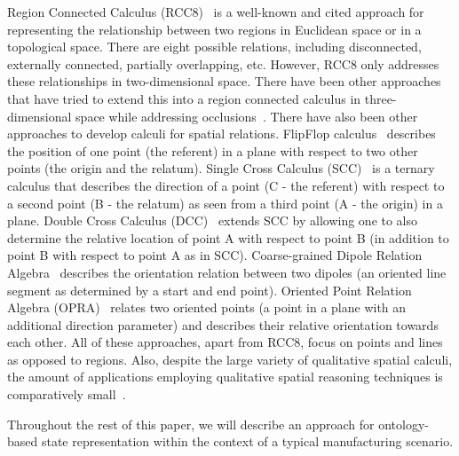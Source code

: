 \documentclass[preprint,12pt]{elsarticle}
\begin{document}
Region Connected Calculus (RCC8)~\cite{Wolter.KR.2000} is a well-known and cited approach for representing the relationship between two regions in Euclidean space or in a topological space. There are eight possible relations, including disconnected, externally connected, partially overlapping, etc. However, RCC8 only addresses these relationships in two-dimensional space. There have been other approaches that have tried to extend this into a region connected calculus in three-dimensional space while addressing occlusions~\cite{Albath.CAINE.2010}. There have also been other approaches to develop calculi for spatial relations. FlipFlop calculus~\cite{Ligozat.1993} describes the position of one point (the referent) in a plane with respect to two other points (the origin and the relatum). Single Cross Calculus (SCC)~\cite{Freksa.LNCS.1992}  is a ternary calculus that describes the direction of a point (C - the referent) with respect to a second point (B - the relatum) as seen from a third point (A - the origin) in a plane. Double Cross Calculus (DCC)~\cite{Freksa.LNCS.1992} extends SCC by allowing one to also determine the relative location of point A with respect to point B (in addition to point B with respect to point A as in SCC). Coarse-grained Dipole Relation Algebra~\cite{Schlieder.1995} describes the orientation relation between two dipoles (an oriented line segment as determined by a start and end point). Oriented Point Relation Algebra (OPRA)~\cite{Moratz.IJCAI.2005} relates two oriented points (a point in a plane with an additional direction parameter) and describes their relative orientation towards each other. All of these approaches, apart from RCC8, focus on points and lines as opposed to regions. Also, despite the large variety of qualitative spatial calculi, the amount of applications employing qualitative spatial reasoning techniques is comparatively small~\cite{Wallgrun.ICSC.2007}.

Throughout the rest of this paper, we will describe an approach for ontology-based state representation within the context of a typical manufacturing scenario.

\end{document}
